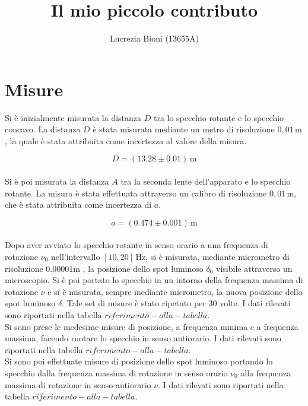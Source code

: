 \documentclass{article} %
\title{Il mio piccolo contributo} %
\author{Lucrezia Bioni (13655A)} %
\date{} %
\let\oldsection\section%
\renewcommand{\section}{%
	\renewcommand{\theequation}{\thesection.\arabic{equation}}%
	\oldsection}%
\begin{document}
    \maketitle
    \section{Misure} %
    
    Si è inizialmente misurata la distanza $D$ tra lo specchio rotante e lo specchio concavo. La distanza $D$ è stata misurata 
    mediante un metro di risoluzione $ 0,01 \, \text{m} $, la quale è stata attribuita come incertezza al valore della misura.

    \begin{equation}
        \label{equation for D}
        D = (13.28 \pm 0.01) \, \text{m}
    \end{equation} \\
    Si è poi misurata la distanza $A$ tra la seconda lente dell'apparato e lo specchio rotante. La misura è stata effettuata
    attraverso un calibro di risoluzione $ 0,01 \, \text{m} $, che è stata attribuita come incertezza di $a$.
    
    \begin{equation}
        \label{equation for a}
        a = (0.474 \pm 0.001) \, \text{m}
    \end{equation} \\
    Dopo aver avviato lo specchio rotante in senso orario a una frequenza di rotazione $ \nu_0 $ nell'intervallo $[10,20] \, \text{Hz}$,
    si è misurata, mediante micrometro di risoluzione $ 0.00001 \text{m} $ , la posizione dello spot luminoso $\delta_0$ visibile attraverso
    un microscopio. Si è poi portato lo specchio in un intorno della frequenza massima di rotazione $ \nu $ e si è misurata,
    sempre mediante micrometro, la nuova posizione dello spot luminoso $\delta$. Tale set di misure è stato ripetuto per $30$ volte.
    I dati rilevati sono riportati nella tabella $ riferimento-alla-tabella $. \\ 

    Si sono prese le medesime misure di posizione, a frequenza minima e a frequenza massima, facendo ruotare
    lo specchio in senso antiorario. I dati rilevati sono riportati nella tabella $ riferimento-alla-tabella $. \\ 

    Si sono poi effettuate misure di posizione dello spot luminoso portando lo specchio dalla frequenza massima di rotazione in senso
    orario $\nu_0$ alla frequenza massima di rotazione in senso antiorario $\nu$.
    I dati rilevati sono riportati nella tabella $ riferimento-alla-tabella $. \\
\end{document}
